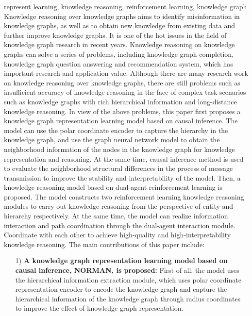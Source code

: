 \documentclass[algorithmlist, AutoFakeBold, AutoFakeSlant, figurelist, tablelist, nomlist, engineering]{seuthesix}
\begin{document}
\begin{englishabstract}{represent learning, knowledge reasoning, reinforcement learning, knowledge graph}
  Knowledge reasoning over knowledge graphs aims to identify misinformation in knowledge graphs, as well as to obtain new knowledge from existing data and further improve knowledge graphs. 
  It is one of the hot issues in the field of knowledge graph research in recent years. 
  Knowledge reasoning on knowledge graphs can solve a series of problems, including knowledge graph completion, knowledge graph question answering and recommendation system, which has important research and application value. 
  Although there are many research work on knowledge reasoning over knowledge graphs, there are still problems such as insufficient accuracy of knowledge reasoning in the face of complex task scenarios such as knowledge graphs with rich hierarchical information and long-distance knowledge reasoning. 
  In view of the above problems, this paper first proposes a knowledge graph representation learning model based on causal inference. 
  The model can use the polar coordinate encoder to capture the hierarchy in the knowledge graph, and use the graph neural network model to obtain the neighborhood information of the nodes in the knowledge graph for knowledge representation and reasoning. 
  At the same time, causal inference method is used to evaluate the neighborhood structural differences in the process of message transmission to improve the stability and interpretability of the model.
  Then, a knowledge reasoning model based on dual-agent reinforcement learning is proposed. 
  The model constructs two reinforcement learning knowledge reasoning modules to carry out knowledge reasoning from the perspective of entity and hierarchy respectively. 
  At the same time, the model can realize information interaction and path coordination through the dual-agent interaction module.
  Coordinate with each other to achieve high-quality and high-interpretability knowledge reasoning. 
  The main contributions of this paper include:
  \begin{itemize}
    \item [1)]\textbf{A knowledge graph representation learning model based on causal inference, NORMAN, is proposed:}
    First of all, the model uses the hierarchical information extraction module, which uses polar coordinate representation encoder to encode the knowledge graph and capture the hierarchical information of the knowledge graph through radius coordinates to improve the effect of knowledge graph representation.

\end{itemize}
\end{englishabstract}
\end{document}
